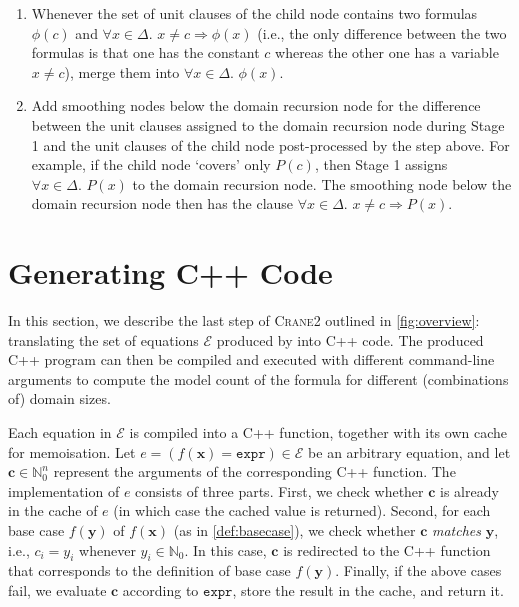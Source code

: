\documentclass{article}
\theoremstyle{definition}
\newcommand{\expr}{\mathtt{expr}}
\newcommand{\Cranetwo}{\textsc{Crane2}}
\begin{document}
\begin{enumerate}
  \item Whenever the set of unit clauses of the child node contains two formulas
        $\phi(c)$ and $\forall x \in \Delta\text{.
        } x \ne c \Rightarrow \phi(x)$ (i.e., the only difference between the
        two formulas is that one has the constant $c$ whereas the other one has
        a variable $x \ne c$), merge them into $\forall x \in \Delta\text{.
        }\phi(x)$.
  \item Add smoothing nodes below the domain recursion node for the difference
        between the unit clauses assigned to the domain recursion node during
        Stage 1 and the unit clauses of the child node post-processed by the
        step above. For example, if the child node `covers' only $P(c)$, then
        Stage 1 assigns $\forall x \in \Delta\text{. }P(x)$ to the domain
        recursion node. The smoothing node below the domain recursion node then
        has the clause $\forall x \in \Delta\text{. } x \ne c \Rightarrow P(x)$.
\end{enumerate}



\section{Generating C++ Code}\label{sec:cpp}

In this section, we describe the last step of \Cranetwo{} outlined in
\cref{fig:overview}: translating the set of equations $\mathcal{E}$ produced by
\CompileWithBaseCases into C++ code. The produced C++ program can then be
compiled and executed with different command-line arguments to compute the model
count of the formula for different (combinations of) domain sizes.

Each equation in $\mathcal{E}$ is compiled into a C++ function, together with
its own cache for memoisation. Let
$e = (f(\mathbf{x}) = \expr{}) \in \mathcal{E}$ be an arbitrary equation, and
let $\mathbf{c} \in \mathbb{N}_{0}^{n}$ represent the arguments of the
corresponding C++ function. The implementation of $e$ consists of three parts.
First, we check whether $\mathbf{c}$ is already in the cache of $e$ (in which
case the cached value is returned). Second, for each base case $f(\mathbf{y})$
of $f(\mathbf{x})$ (as in \cref{def:basecase}), we check whether $\mathbf{c}$
\emph{matches} $\mathbf{y}$, i.e., $c_{i} = y_{i}$ whenever
$y_{i} \in \mathbb{N}_{0}$. In this case, $\mathbf{c}$ is redirected to the C++
function that corresponds to the definition of base case $f(\mathbf{y})$.
Finally, if the above cases fail, we evaluate $\mathbf{c}$ according to
$\expr{}$, store the result in the cache, and return it.
\end{document}
